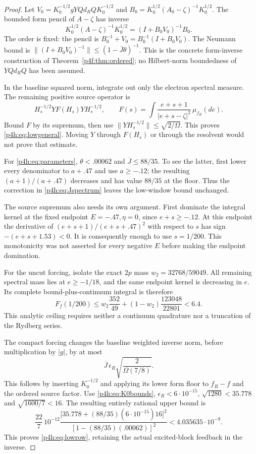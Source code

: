 \documentclass[11pt]{article}
\numberwithin{equation}{section}
\theoremstyle{definition}
\theoremstyle{remark}
\begin{document}
\begin{proof}
Let $V_0=K_0^{-1/2}gYQd_RQK_0^{-1/2}$ and
$B_0=K_0^{1/2}(A_0-\zeta)^{-1}K_0^{1/2}$.
The bounded form pencil of $A-\zeta$ has inverse
\[
 K_0^{1/2}(A-\zeta)^{-1}K_0^{1/2}
           =(I+B_0V_0)^{-1}B_0.
\]
The order is fixed: the pencil is
$B_0^{-1}+V_0=B_0^{-1}(I+B_0V_0)$.
The Neumann bound is
$\|(I+B_0V_0)^{-1}\|\leq(1-\overline J\theta)^{-1}$.
This is the concrete form-inverse construction of
Theorem~\ref{p4f:thm:ordered}; no Hilbert-norm boundedness of
$YQd_RQ$ has been assumed.

In the baseline squared norm, integrate out only the electron
spectral measure. The remaining positive source operator is
\[
 H_s^{-1/2}YF(H_s)YH_s^{-1/2},\qquad
 F(s)=\int\frac{e+s+1}{|e+s-\zeta|^2}\,\mu_{f_R}(de).
\]
Bound $F$ by its supremum, then use
$\|YH_s^{-1/2}\|\leq\sqrt{2/\Omega}$.
This proves \eqref{p4h:eq:lowgeneral}.
Moving $Y$ through $F(H_s)$ or through the resolvent would
not prove that estimate.

For \eqref{p4h:eq:parameters},
$\theta<.00062$ and $\overline J\leq88/35$.
To see the latter, first lower every denominator to
$a+.47$ and use $a\geq-.12$; the resulting
$(a+1)/(a+.47)$ decreases and has value $88/35$ at the floor.
Thus the correction in \eqref{p4h:eq:Jspectrum} leaves the
low-window bound unchanged.

The source supremum also needs its own argument.
First dominate the integral kernel at the fixed endpoint
$E=-.47,\eta=0$, since $e+s\geq-.12$.
At this endpoint the derivative of
$(e+s+1)/(e+s+.47)^2$ with respect to $s$ has sign
$-(e+s+1.53)<0$. It is consequently enough to use $s=1/200$.
This monotonicity was not asserted for every negative $E$
before making the endpoint domination.

For the uncut forcing, isolate the exact $2p$ mass
$w_2=32768/59049$. All remaining spectral mass lies at
$e\geq-1/18$, and the same endpoint kernel is decreasing
in $e$. Its complete bound-plus-continuum integral is therefore
\begin{equation}\label{p4h:eq:Fceiling}
 F_f(1/200)\leq
 w_2\frac{352}{49}+(1-w_2)\frac{123048}{22801}<6.4 .
\end{equation}
This analytic ceiling requires neither a continuum quadrature
nor a truncation of the Rydberg series.

The compact forcing changes the baseline weighted inverse
norm, before multiplication by $|g|$, by at most
\[
 \overline J\,\epsilon_R\sqrt{\frac2{\Omega(7/8)}}.
\]
This follows by inserting $K_0^{-1/2}$ and applying its
lower form floor to $f_R-f$ and the ordered source factor.
Use \eqref{p4h:eq:K0bounds}, $\epsilon_R<6\cdot10^{-15}$,
$\sqrt{1280}<35.778$ and $\sqrt{1600/7}<16$.
The resulting entirely rational upper bound is
\[
 \frac{22}{7}\,10^{-12}
 \frac{\big[35.778+(88/35)(6\cdot10^{-15})16\big]^2}
      {[1-(88/35)(.00062)]^2}
       <4.035635\cdot10^{-9}.
\]
This proves \eqref{p4h:eq:lowrow}, retaining the actual
excited-block feedback in the inverse.
\end{proof}
\end{document}
